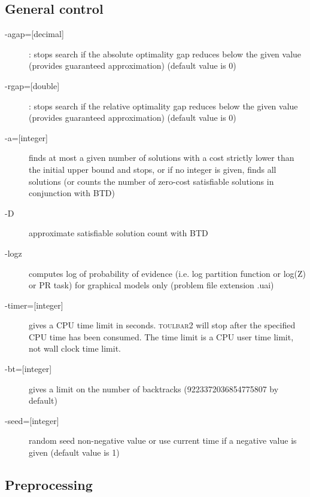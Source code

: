 \documentclass{article}
\def\toulbar2{\textsc{toulbar2}}
\begin{document}
\subsection{General control}

\begin{description}
\item[{-agap=[decimal]}] : stops search if the absolute optimality gap reduces below the given value (provides guaranteed approximation) (default value is 0)
\item[{-rgap=[double]}] : stops search if the relative optimality gap reduces below the given value (provides guaranteed approximation) (default value is 0)
\item[{-a=[integer]}] finds at most a given number of solutions with a cost strictly lower than the initial upper bound and stops, 
or if no integer is given, finds all solutions (or counts the number of zero-cost satisfiable solutions in conjunction with BTD)
\item[{-D}] approximate satisfiable solution count with BTD
\item[{-logz}] computes log of probability of evidence (i.e. log
  partition function or log(Z) or PR task) for graphical models only
  (problem file extension .uai)
\item[{-timer=[integer]}] gives a CPU time limit in seconds. \toulbar2
  will stop after the specified CPU time has been consumed. The time
  limit is a CPU user time limit, not wall clock time limit.
\item[{-bt=[integer]}] gives a limit on the number of backtracks (9223372036854775807 by default)
\item[{-seed=[integer]}] random seed non-negative value or use current time if a negative value is given (default value is 1)
\end{description}

\subsection{Preprocessing}
\end{document}
